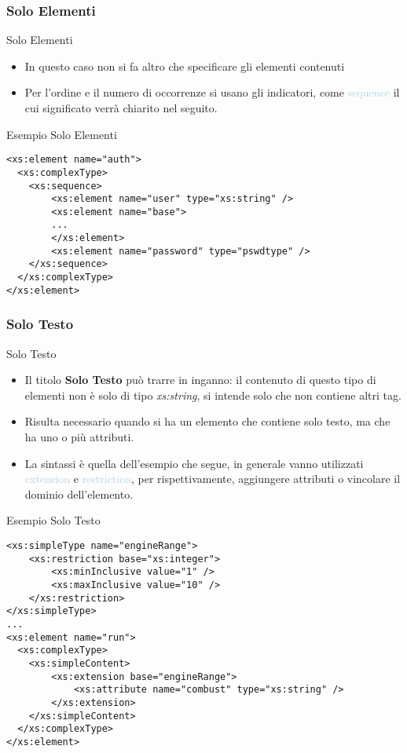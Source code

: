 \documentclass{beamer}
\begin{document}
	\subsubsection{Solo Elementi}
	\begin{frame}{Solo Elementi}
	\begin{itemize}
	\item In questo caso non si fa altro che specificare gli elementi contenuti\bigskip
	\item Per l'ordine e il numero di occorrenze si usano gli indicatori, come \textcolor{lightblue}{sequence} il cui significato verrà chiarito nel seguito.
	\end{itemize}
	\end{frame}
	\begin{frame}[containsverbatim]
	\begin{block}{Esempio Solo Elementi}
	\begin{lstlisting}
<xs:element name="auth">
  <xs:complexType>
  	<xs:sequence>
  		<xs:element name="user" type="xs:string" />
  		<xs:element name="base">
  		...
  		</xs:element>
  		<xs:element name="password" type="pswdtype" />
  	</xs:sequence>
  </xs:complexType>
</xs:element> 
	\end{lstlisting}
	\end{block}
	\end{frame}
	\subsubsection{Solo Testo}
	\begin{frame}{Solo Testo}
	\begin{itemize}
	\item Il titolo \textbf{Solo Testo} può trarre in inganno: il contenuto di questo tipo di elementi non è solo di tipo \textit{xs:string}, si intende solo che non contiene altri tag.\bigskip
	\item Risulta necessario quando si ha un elemento che contiene solo testo, ma che ha uno o più attributi.\bigskip
	\item La sintassi è quella dell'esempio che segue, in generale vanno utilizzati \textcolor{lightblue}{extension} e \textcolor{lightblue}{restriction}, per rispettivamente, aggiungere attributi o vincolare il dominio dell'elemento.
	\end{itemize}
	\end{frame}
		\begin{frame}[containsverbatim]
	\begin{block}{Esempio Solo Testo}
	\begin{lstlisting}
<xs:simpleType name="engineRange">
	<xs:restriction base="xs:integer">
		<xs:minInclusive value="1" />
		<xs:maxInclusive value="10" />
	</xs:restriction>
</xs:simpleType>
...
<xs:element name="run">
  <xs:complexType>
  	<xs:simpleContent>
  		<xs:extension base="engineRange">
  			<xs:attribute name="combust" type="xs:string" />
  		</xs:extension>
  	</xs:simpleContent>
  </xs:complexType>
</xs:element> 
	\end{lstlisting}
	\end{block}
	\end{frame}
\end{document}
